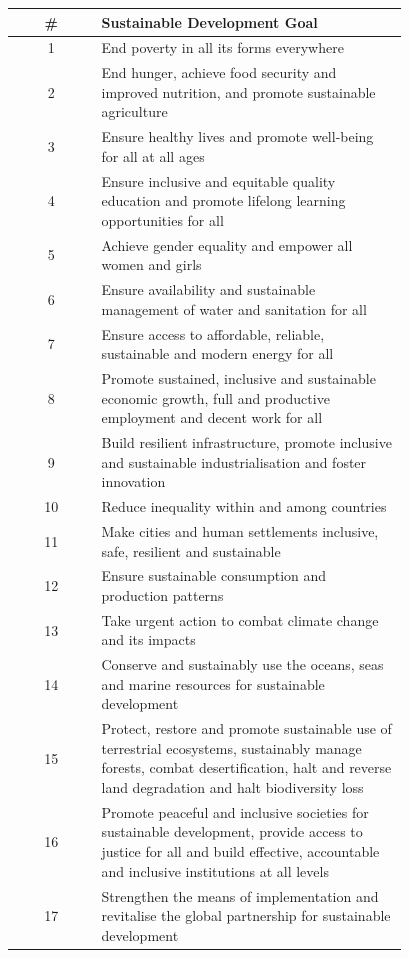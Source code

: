 \documentclass[a4paper,12pt]{article}
\begin{document}
\begin{center}
\footnotesize
\renewcommand{\arraystretch}{1.3}
\begin{longtable}{cp{0.78\linewidth}}
\toprule
\textbf{\#} & \textbf{Sustainable Development Goal} \\
\midrule
1 & End poverty in all its forms everywhere \\
2 & End hunger, achieve food security and improved nutrition, and promote sustainable agriculture \\
3 & Ensure healthy lives and promote well-being for all at all ages \\
4 & Ensure inclusive and equitable quality education and promote lifelong learning opportunities for all \\
5 & Achieve gender equality and empower all women and girls \\
6 & Ensure availability and sustainable management of water and sanitation for all \\
7 & Ensure access to affordable, reliable, sustainable and modern energy for all \\
8 & Promote sustained, inclusive and sustainable economic growth, full and productive employment and decent work for all \\
9 & Build resilient infrastructure, promote inclusive and sustainable industrialisation and foster innovation \\
10 & Reduce inequality within and among countries \\
11 & Make cities and human settlements inclusive, safe, resilient and sustainable \\
12 & Ensure sustainable consumption and production patterns \\
13 & Take urgent action to combat climate change and its impacts \\
14 & Conserve and sustainably use the oceans, seas and marine resources for sustainable development \\
15 & Protect, restore and promote sustainable use of terrestrial ecosystems, sustainably manage forests, combat desertification, halt and reverse land degradation and halt biodiversity loss \\
16 & Promote peaceful and inclusive societies for sustainable development, provide access to justice for all and build effective, accountable and inclusive institutions at all levels \\
17 & Strengthen the means of implementation and revitalise the global partnership for sustainable development \\
\bottomrule
\end{longtable}
\end{center}
\end{document}
